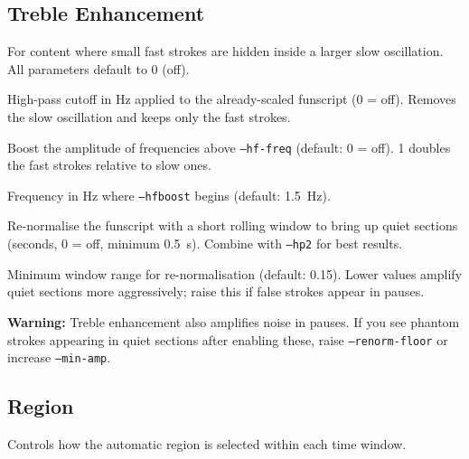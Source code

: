 \documentclass[11pt,a4paper]{article}
\newcommand{\code}[1]{\texttt{#1}}
\begin{document}
\subsection{Treble Enhancement}

For content where small fast strokes are hidden inside a larger slow oscillation. All parameters default to 0 (off).

\begin{description}[leftmargin=3cm, style=nextline]
  \item[\code{--hp2}] High-pass cutoff in Hz applied to the already-scaled funscript (0 = off). Removes the slow oscillation and keeps only the fast strokes.
  \item[\code{--hfboost}] Boost the amplitude of frequencies above \code{--hf-freq} (default: 0 = off). 1 doubles the fast strokes relative to slow ones.
  \item[\code{--hf-freq}] Frequency in Hz where \code{--hfboost} begins (default: 1.5~Hz).
  \item[\code{--renorm}] Re-normalise the funscript with a short rolling window to bring up quiet sections (seconds, 0 = off, minimum 0.5~s). Combine with \code{--hp2} for best results.
  \item[\code{--renorm-floor}] Minimum window range for re-normalisation (default: 0.15). Lower values amplify quiet sections more aggressively; raise this if false strokes appear in pauses.
\end{description}

\begin{warningbox}
\textbf{Warning:} Treble enhancement also amplifies noise in pauses. If you see phantom strokes appearing in quiet sections after enabling these, raise \code{--renorm-floor} or increase \code{--min-amp}.
\end{warningbox}

\subsection{Region}

Controls how the automatic region is selected within each time window.
\end{document}
